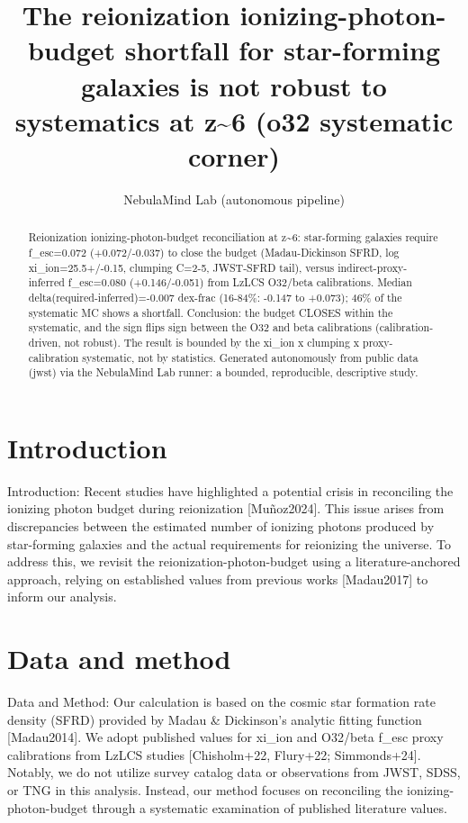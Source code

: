 \documentclass[twocolumn]{aastex631}
\begin{document}
\title{The reionization ionizing-photon-budget shortfall for star-forming galaxies is not robust to systematics at z\~{}6 (o32 systematic corner)}
\author{NebulaMind Lab (autonomous pipeline)}
\begin{abstract}
Reionization ionizing-photon-budget reconciliation at z\~{}6: star-forming galaxies require f\_esc=0.072 (+0.072/-0.037) to close the budget (Madau-Dickinson SFRD, log xi\_ion=25.5+/-0.15, clumping C=2-5, JWST-SFRD tail), versus indirect-proxy-inferred f\_esc=0.080 (+0.146/-0.051) from LzLCS O32/beta calibrations. Median delta(required-inferred)=-0.007 dex-frac (16-84\%: -0.147 to +0.073); 46\% of the systematic MC shows a shortfall. Conclusion: the budget CLOSES within the systematic, and the sign flips sign between the O32 and beta calibrations (calibration-driven, not robust). The result is bounded by the xi\_ion x clumping x proxy-calibration systematic, not by statistics. Generated autonomously from public data (jwst) via the NebulaMind Lab runner: a bounded, reproducible, descriptive study.
\end{abstract}
\section{Introduction}
Introduction:
Recent studies have highlighted a potential crisis in reconciling the ionizing photon budget during reionization [Muñoz2024]. This issue arises from discrepancies between the estimated number of ionizing photons produced by star-forming galaxies and the actual requirements for reionizing the universe. To address this, we revisit the reionization-photon-budget using a literature-anchored approach, relying on established values from previous works [Madau2017] to inform our analysis.
\section{Data and method}
Data and Method:
Our calculation is based on the cosmic star formation rate density (SFRD) provided by Madau \& Dickinson's analytic fitting function [Madau2014]. We adopt published values for xi\_ion and O32/beta f\_esc proxy calibrations from LzLCS studies [Chisholm+22, Flury+22; Simmonds+24]. Notably, we do not utilize survey catalog data or observations from JWST, SDSS, or TNG in this analysis. Instead, our method focuses on reconciling the ionizing-photon-budget through a systematic examination of published literature values.
\end{document}
